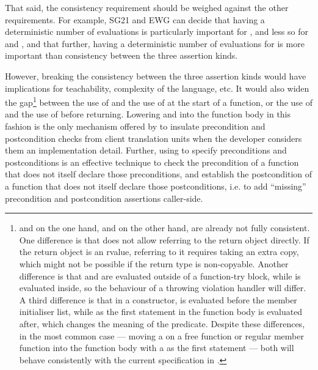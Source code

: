 That said, the consistency requirement should be weighed against the other requirements. For example, SG21 and EWG can decide that having a deterministic number of evaluations is particularly important for , and less so for  and , and that further, having a deterministic number of evaluations for  is more important than consistency between the three assertion kinds.

However, breaking the consistency between the three assertion kinds would have implications for teachability, complexity of the language, etc. It would also widen the gap\footnote{ and  on the one hand, and  on the other hand, are already not fully consistent. One difference is that  does not allow referring to the return object directly. If the return object is an rvalue, referring to it requires taking an extra copy, which might not be possible if the return type is non-copyable. Another difference is that  and  are evaluated outside of a function-try block, while  is evaluated inside, so the behaviour of a throwing violation handler will differ. A third difference is that in a constructor,  is evaluated before the member initialiser list, while  as the first statement in the function body is evaluated after, which changes the meaning of the predicate. Despite these differences, in the most common case --- moving a  on a free function or regular member function into the function body with a  as the first statement --- both will behave consistently with the current specification in \cite{P2900R6}.} between the use of  and the use of  at the start
of a function, or the use of  and the use of  before returning. Lowering  and  into the function body in this fashion is the only mechanism offered by \cite{P2900R6} to insulate precondition and postcondition checks from client translation units when the developer considers them an implementation detail. Further, using  to specify preconditions and postconditions is an effective technique to check the precondition of a function that does not itself declare those preconditions, and establish the postcondition of a function that does not itself declare those postconditions, i.e. to add ``missing'' precondition and postcondition assertions caller-side.

